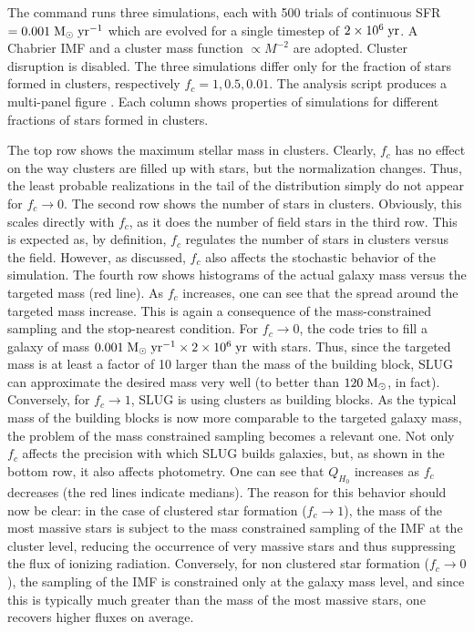 \documentclass[letterpaper,10pt,english]{sphinxmanual}
\begin{document}
The command   runs three  simulations, each with 500 trials
of continuous  SFR \(=0.001\rm\;M_\odot\;yr^{-1}\) which are evolved for a
single timestep of  \(2\times 10^6\rm\;yr\). A Chabrier IMF and a cluster mass function
\(\propto M^{-2}\) are adopted. Cluster disruption is disabled. The three simulations
differ only for the fraction of stars formed in clusters, respectively \(f_c=1,0.5,0.01\).
The analysis script  produces a multi-panel figure
. Each column shows properties of simulations for different
fractions of stars formed in clusters.

The top row shows the maximum stellar mass in clusters. Clearly, \(f_c\) has no effect on the way
clusters are filled up with stars, but the normalization changes. Thus,  the least probable realizations
in the tail of the distribution simply do not appear for \(f_c \rightarrow 0\). The second row
shows the number of stars in clusters. Obviously, this scales directly with  \(f_c\), as it does the number
of field stars in the third row. This is expected as, by definition, \(f_c\) regulates the number of stars in
clusters versus the field. However, as discussed, \(f_c\) also affects the stochastic behavior of the
simulation. The fourth row shows histograms of the actual galaxy mass versus the targeted mass (red line).
As \(f_c\) increases, one can see that the spread around the targeted mass increase. This is again
a consequence of the mass-constrained sampling and the stop-nearest condition. For \(f_c \rightarrow 0\),
the code tries to fill a galaxy of mass \(0.001\rm\;M_\odot\;yr^{-1} \times 2\times 10^6\rm\;yr\)
with stars. Thus, since the targeted mass is at least a factor of 10 larger than the mass of the
building block, SLUG can approximate the desired mass very well (to better than \(120\rm\;M_\odot\), in fact).
Conversely, for \(f_c \rightarrow 1\), SLUG is using clusters as building blocks. As the typical
mass of the building blocks is now more comparable to the targeted galaxy mass, the problem of the
mass constrained sampling becomes a relevant one. Not only \(f_c\) affects the precision with which
SLUG builds galaxies, but, as shown in the bottom row, it also affects photometry. One can see that
\(Q_{H_0}\) increases as \(f_c\) decreases (the red lines indicate medians).
The reason for this behavior should now be clear:
in the case of clustered star formation (\(f_c \rightarrow 1\)), the mass of the most massive stars
is subject to the mass constrained sampling of the IMF at the cluster level, reducing the occurrence of
very massive stars and thus suppressing the flux of ionizing radiation. Conversely, for non clustered star formation
(\(f_c \rightarrow 0\)), the sampling of the IMF is constrained only at the galaxy mass level, and since this
is typically much greater than the mass of the most massive stars, one recovers higher fluxes on average.
\end{document}
